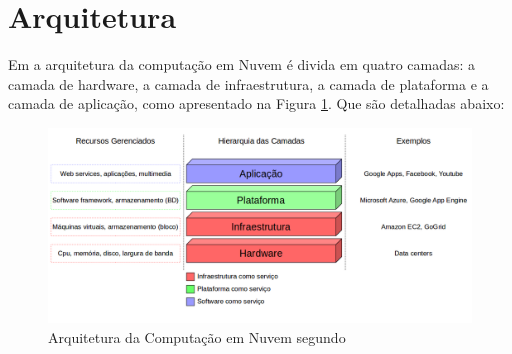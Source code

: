 \section{Arquitetura}

Em \citep{stateOfArt:2010} a arquitetura da computação em Nuvem é divida em quatro camadas: a camada de hardware, a camada de infraestrutura, a camada de plataforma e a camada de aplicação, como apresentado na Figura \ref{architecture1}. Que são detalhadas abaixo:

\begin{figure}[htbp]
  \centering \includegraphics[scale=.4]{imgs/architecture1.png}
\caption{Arquitetura da Computação em Nuvem segundo \citep{stateOfArt:2010}} 
\label{architecture1}
\end{figure}

